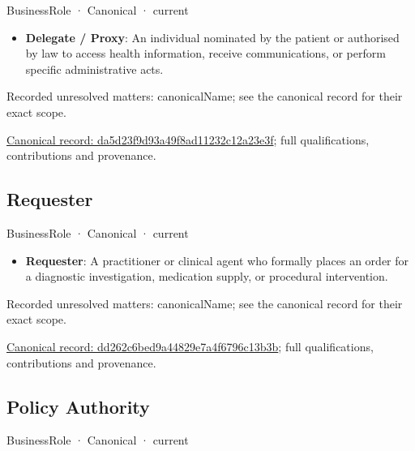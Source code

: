\label{element:da5d23f9d93a49f8ad11232c12a23e3f}
{\small BusinessRole · Canonical · current}\par

\begin{itemize}


\item \textbf{Delegate / Proxy}: An individual nominated by the patient or authorised by law to access health information, receive communications, or perform specific administrative acts.

\end{itemize}

{\small Recorded unresolved matters: canonicalName; see the canonical record for their exact scope.}\par
{\footnotesize \href{../../../../continuum/business/business-role/da5d23f9d93a49f8ad11232c12a23e3f.md}{Canonical record: da5d23f9d93a49f8ad11232c12a23e3f}; full qualifications, contributions and provenance.}\par
\subsection{Requester}

\label{element:dd262c6bed9a44829e7a4f6796c13b3b}
{\small BusinessRole · Canonical · current}\par

\begin{itemize}


\item \textbf{Requester}: A practitioner or clinical agent who formally places an order for a diagnostic investigation, medication supply, or procedural intervention.

\end{itemize}

{\small Recorded unresolved matters: canonicalName; see the canonical record for their exact scope.}\par
{\footnotesize \href{../../../../continuum/business/business-role/dd262c6bed9a44829e7a4f6796c13b3b.md}{Canonical record: dd262c6bed9a44829e7a4f6796c13b3b}; full qualifications, contributions and provenance.}\par
\subsection{Policy Authority}

\label{element:e0ff9ce2cf4448568d1caf7a44023f48}
{\small BusinessRole · Canonical · current}\par


